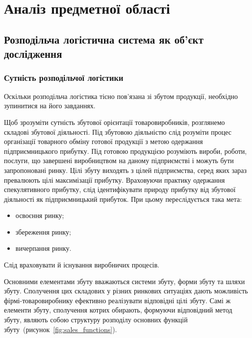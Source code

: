 \section{Аналіз предметної області}
\subsection{Розподільча логістична система як об'єкт дослідження}
\subsubsection{Сутність розподільчої логістики}
Оскільки розподільча логістика тісно пов’язана зі збутом продукції, необхідно зупинитися на його завданнях.

Щоб зрозуміти сутність збутової орієнтації товаровиробників, розглянемо складові збутової діяльності. 
Під збутовою діяльністю слід розуміти процес організації товарного обміну готової продукції з метою одержання підприємницького прибутку. 
Під готовою продукцією розуміють вироби, роботи, послуги, що завершені виробництвом на даному підприємстві і можуть бути запропоновані ринку. 
Цілі збуту виходять з цілей підприємства, серед яких зараз превалюють цілі максимізації прибутку. 
Враховуючи практику одержання спекулятивного прибутку, слід ідентифікувати природу прибутку від збутової діяльності як підприємницький прибуток. 
При цьому переслідується така мета:
\begin{itemize}
	\item освоєння ринку;
	\item збереження ринку;
	\item вичерпання ринку.
\end{itemize}

Слід враховувати й існування виробничих процесів.

Основними елементами збуту вважаються системи збуту, форми збуту та шляхи збуту. 
Сполучення цих складових у різних ринкових ситуаціях дають можливість фірмі-товаровиробнику ефективно реалізувати відповідні цілі збуту. 
Самі ж елементи збуту, сполучення котрих обирають, формуючи відповідний метод збуту, являють собою структуру розподілу основних функцій збуту~(рисунок~\ref{fig:sales_functions}).

